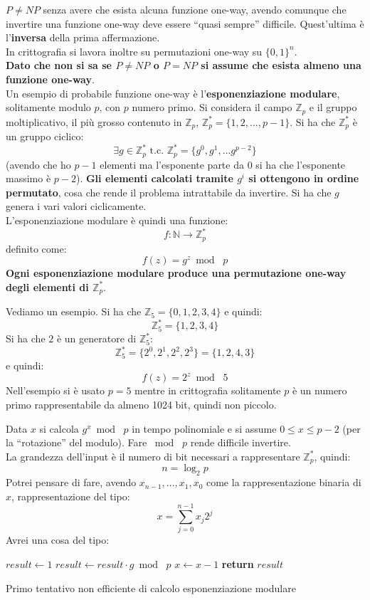 \documentclass[a4paper,12pt, oneside]{book}
\begin{document}
$P\neq NP$ senza avere che esista alcuna funzione one-way, avendo comunque che
invertire una funzione one-way deve essere ``quasi sempre''
difficile. Quest'ultima è l'\textbf{inversa} della prima affermazione.\\
In crittografia si lavora inoltre su permutazioni one-way su $\{0,1\}^n$.\\
\textbf{Dato che non si sa se $P\neq NP$ o $P=NP$ si assume che esista almeno
  una funzione one-way}.\\
Un esempio di probabile funzione one-way è l'\textbf{esponenziazione modulare},
solitamente modulo $p$, con $p$ numero primo. Si considera il campo
$\mathbb{Z}_p$ e il gruppo moltiplicativo, il più grosso contenuto in
$\mathbb{Z}_p$, $\mathbb{Z}^*_p=\{1,2,\ldots, p-1\}$.  Si ha che
$\mathbb{Z}^*_p$ è un gruppo ciclico:
\[\exists g\in \mathbb{Z}^*_p \mbox{ t.c. } \mathbb{Z}^*_p=\{g^0,g^1,\ldots
  g^{p-2}\}\]
(avendo che ho $p-1$ elementi ma l'esponente parte da 0 si ha che l'esponente
massimo è $p-2$). \textbf{Gli elementi calcolati tramite $g^i$ si ottengono in
  ordine permutato}, cosa che rende il problema intrattabile da invertire. Si ha
che $g$ genera i vari valori ciclicamente.\\ 
L'esponenziazione modulare è quindi una funzione:
\[f:\mathbb{N}\to \mathbb{Z}^*_p\]
definito come:
\[f(z)=g^z\bmod\,\,p\]
\textbf{Ogni esponenziazione modulare produce una permutazione one-way degli
  elementi di $\mathbb{Z}^*_p$}.
\begin{esempio}
  Vediamo un esempio.
  Si ha che $\mathbb{Z}_5=\{0,1,2,3,4\}$ e quindi:
  \[\mathbb{Z}^*_5=\{1,2,3,4\}\]
  Si ha che $2$ è un generatore di $\mathbb{Z}^*_5$:
  \[\mathbb{Z}^*_5=\{2^0,2^1,2^2,2^3\}=\{1,2,4,3\}\]
  e quindi:
  \[f(z)=2^z\bmod\,\,5\]
  Nell'esempio si è usato $p=5$ mentre in crittografia solitamente $p$ è un
  numero primo rappresentabile da almeno 1024 bit, quindi non piccolo.
\end{esempio}
Data $x$ si calcola $g^x\bmod\,\,p$ in tempo polinomiale e si assume $0\leq
x\leq p-2$ (per la ``rotazione'' del modulo). Fare $\bmod\,\,p$ rende difficile
invertire. \\ 
La grandezza dell'input è il numero di bit necessari a rappresentare
$\mathbb{Z}^*_p$, quindi:
\[n=\log_2p\]
Potrei pensare di fare, avendo $x_{n-1},\ldots, x_1, x_0$ come la
rappresentazione binaria di $x$, rappresentazione del tipo:
\[x=\sum_{j=0}^{n-1}x_j2^j\]
Avrei una cosa del tipo:
\begin{algorithm}[H]
  \begin{algorithmic}
    \State $result\gets 1$
    \State $result \gets result \cdot g\bmod\,\,p$
    \State $x\gets x-1$
    \EndWhile
    \State \textbf{return} $result$ 
    \EndFunction
  \end{algorithmic}
  \caption{Primo tentativo non efficiente di calcolo esponenziazione modulare}
\end{algorithm}
\end{document}
